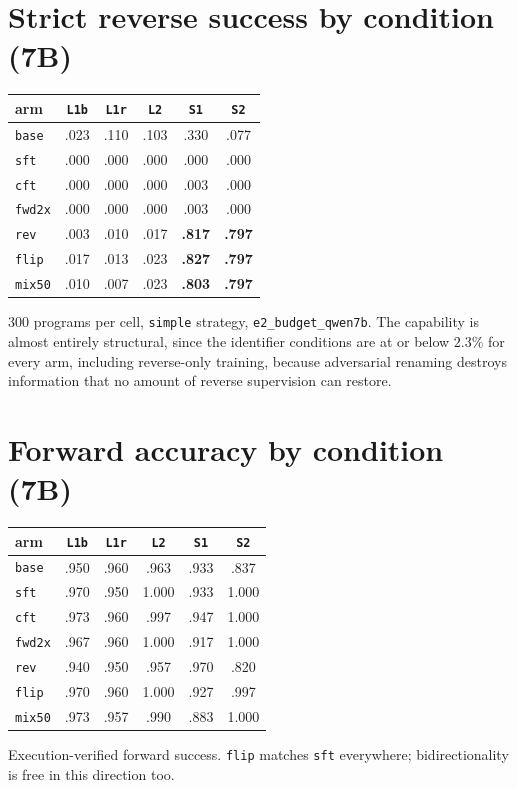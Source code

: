 \documentclass{article}
\newcommand{\arm}[1]{\texttt{#1}}
\begin{document}
\section{Strict reverse success by condition (7B)}
\label{app:bycond}
\begin{center}\small
\begin{tabular}{lccccc}
\toprule
arm & \arm{L1b} & \arm{L1r} & \arm{L2} & \textbf{\arm{S1}} & \textbf{\arm{S2}} \\
\midrule
\arm{base}  & .023 & .110 & .103 & .330 & .077 \\
\arm{sft}   & .000 & .000 & .000 & .000 & .000 \\
\arm{cft}   & .000 & .000 & .000 & .003 & .000 \\
\arm{fwd2x} & .000 & .000 & .000 & .003 & .000 \\
\arm{rev}   & .003 & .010 & .017 & \textbf{.817} & \textbf{.797} \\
\arm{flip}  & .017 & .013 & .023 & \textbf{.827} & \textbf{.797} \\
\arm{mix50} & .010 & .007 & .023 & \textbf{.803} & \textbf{.797} \\
\bottomrule
\end{tabular}
\end{center}
300 programs per cell, \texttt{simple} strategy, \texttt{e2\_budget\_qwen7b}. The
capability is almost entirely structural, since the identifier conditions are at or below
$2.3\%$ for every arm, including reverse-only training, because adversarial renaming
destroys information that no amount of reverse supervision can restore.

\section{Forward accuracy by condition (7B)}
\label{app:fwd}
\begin{center}\small
\begin{tabular}{lccccc}
\toprule
arm & \arm{L1b} & \arm{L1r} & \arm{L2} & \arm{S1} & \arm{S2} \\
\midrule
\arm{base}  & .950 & .960 & .963 & .933 & .837 \\
\arm{sft}   & .970 & .950 & 1.000 & .933 & 1.000 \\
\arm{cft}   & .973 & .960 & .997 & .947 & 1.000 \\
\arm{fwd2x} & .967 & .960 & 1.000 & .917 & 1.000 \\
\arm{rev}   & .940 & .950 & .957 & .970 & .820 \\
\arm{flip}  & .970 & .960 & 1.000 & .927 & .997 \\
\arm{mix50} & .973 & .957 & .990 & .883 & 1.000 \\
\bottomrule
\end{tabular}
\end{center}
Execution-verified forward success. \arm{flip} matches \arm{sft} everywhere;
bidirectionality is free in this direction too.
\end{document}
